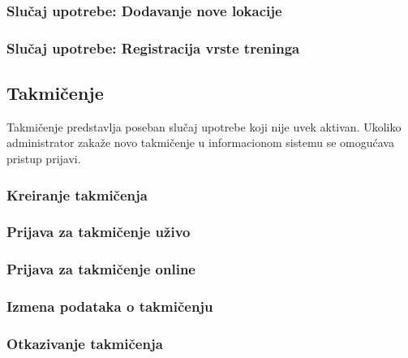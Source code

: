 \documentclass[a4paper]{article}
\begin{document}
\subsubsection{Slučaj upotrebe: Dodavanje nove lokacije}


\subsubsection{Slučaj upotrebe: Registracija vrste treninga}


\newpage
\subsection{Takmičenje}
Takmičenje predstavlja poseban slučaj upotrebe koji nije uvek aktivan. Ukoliko administrator zakaže novo takmičenje u informacionom sistemu se omogućava pristup prijavi. 

\subsubsection{Kreiranje takmičenja}


\subsubsection{Prijava za takmičenje uživo}


\subsubsection{Prijava za takmičenje online}

\subsubsection{Izmena podataka o takmičenju}

\subsubsection{Otkazivanje takmičenja}

\end{document}
